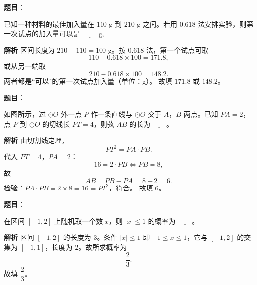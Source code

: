 \begin{answer}

\textbf{题目}：

已知一种材料的最佳加入量在 $110$ g 到 $210$ g 之间。若用 $0.618$ 法安排实验，则第一次试点的加入量可以是 $\underline{\qquad}$ g。

\textbf{解析}
区间长度为 $210-110=100$ g。按 $0.618$ 法，第一个试点可取
\nopagebreak[4]
\[110+0.618\times100=171.8,\]
或从另一端取
\nopagebreak[4]
\[210-0.618\times100=148.2.\]
两者都是“可以”的第一次试点加入量（单位：g）。
故填 $171.8$ 或 $148.2$。


\end{answer}
\begin{answer}

\textbf{题目}：

如图所示，过 $\odot O$ 外一点 $P$ 作一条直线与 $\odot O$ 交于 $A$，$B$ 两点。已知 $PA=2$，点 $P$ 到 $\odot O$ 的切线长 $PT=4$，则弦 $AB$ 的长为 $\underline{\qquad}$。
\nopagebreak[4]
\begin{center}\end{center}
\nopagebreak[4]
\textbf{解析}
由切割线定理，
\nopagebreak[4]
\[PT^2=PA\cdot PB.\]
代入 $PT=4$，$PA=2$：
\nopagebreak[4]
\[16=2\cdot PB\iff PB=8,\]
故
\nopagebreak[4]
\[AB=PB-PA=8-2=6.\]
检验：$PA\cdot PB=2\times8=16=PT^2$，符合。
故填 $6$。


\end{answer}
\begin{answer}

\textbf{题目}：

在区间 $[-1,2]$ 上随机取一个数 $x$，则 $|x|\leqslant1$ 的概率为 $\underline{\qquad}$。

\textbf{解析}
区间 $[-1,2]$ 的长度为 $3$。条件 $|x|\leqslant1$ 即 $-1\leqslant x\leqslant1$，它与 $[-1,2]$ 的交集为 $[-1,1]$，长度为 $2$。故所求概率为
\nopagebreak[4]
\[\frac{2}{3}.\]
故填 $\dfrac23$。


\end{answer}
